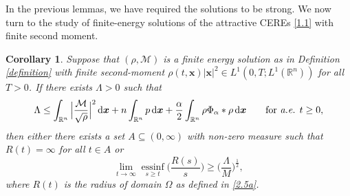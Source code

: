 \documentclass[reqno,11pt]{amsart}
\numberwithin{equation}{section}
\newtheorem{corollary}[theorem]{Corollary}
\theoremstyle{definition}
\def\dd{{\, \rm d}}
\begin{document}
In the previous lemmas, we have required the solutions to be strong. 
We now turn to the study of finite-energy solutions of the attractive CEREs \eqref{1.1} 
with finite second moment.


\begin{corollary}
Suppose that $(\rho,\mathcal{M})$ is a finite energy solution as in {\rm Definition \ref{definition}} 
with finite second-moment 
$\rho(t,\boldsymbol{x}) |\boldsymbol{x}|^2 \in L^1(0,T;L^1(\mathbb{R}^n))$ for all $T>0$. 
If there exists $\Lambda > 0$ such that
\[
\Lambda \leq \int_{\mathbb{R}^n} \Big| \frac{\mathcal{M}}{\sqrt{\rho}} \Big|^2\dd \boldsymbol{x}+n\int_{\mathbb{R}^n}p\dd \boldsymbol{x} + \frac{\alpha}{2}\int_{\mathbb{R}^n}\rho\Phi_\alpha\ast\rho\dd \boldsymbol{x} 
\qquad\mbox{for {\it a.e.} $t \geq 0$},
\]
then either there exists a set $A \subseteq (0,\infty)$ with non-zero measure 
such that $R(t) = \infty$ for all $t \in A$ or
    \[
    \lim_{t \to \infty} \underset{s \geq t}{\text{ess}\inf}
    \Big(\frac{R(s)}{s}\Big)\geq \Big(\frac{\Lambda}{M}\Big)^{\frac{1}{2}},
    \]
where $R(t)$ is the radius of domain $\Omega$ as defined in \eqref{2.5a}.
\end{corollary}
\end{document}
